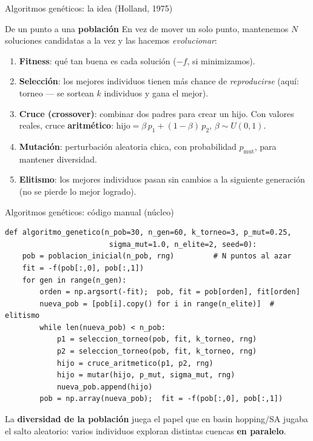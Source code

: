 \documentclass[aspectratio=169,10pt]{beamer}
\begin{document}
\begin{frame}{Algoritmos genéticos: la idea (Holland, 1975)}
  \begin{block}{De un punto a una \textbf{población}}
    En vez de mover un solo punto, mantenemos $N$ soluciones candidatas
    a la vez y las hacemos \emph{evolucionar}:
    \begin{enumerate}
      \item \textbf{Fitness}: qué tan buena es cada solución ($-f$, si
        minimizamos).
      \item \textbf{Selección}: los mejores individuos tienen más
        chance de \emph{reproducirse} (aquí: torneo — se sortean $k$
        individuos y gana el mejor).
      \item \textbf{Cruce (crossover)}: combinar dos padres para crear un
        hijo. Con valores reales, cruce \textbf{aritmético}:
        $\text{hijo}=\beta\,p_1+(1-\beta)\,p_2$, $\beta\sim U(0,1)$.
      \item \textbf{Mutación}: perturbación aleatoria chica, con
        probabilidad $p_{\text{mut}}$, para mantener diversidad.
      \item \textbf{Elitismo}: los mejores individuos pasan sin cambios
        a la siguiente generación (no se pierde lo mejor logrado).
    \end{enumerate}
  \end{block}
\end{frame}

\begin{frame}[fragile]{Algoritmos genéticos: código manual (núcleo)}
\begin{lstlisting}
def algoritmo_genetico(n_pob=30, n_gen=60, k_torneo=3, p_mut=0.25,
                        sigma_mut=1.0, n_elite=2, seed=0):
    pob = poblacion_inicial(n_pob, rng)         # N puntos al azar
    fit = -f(pob[:,0], pob[:,1])
    for gen in range(n_gen):
        orden = np.argsort(-fit);  pob, fit = pob[orden], fit[orden]
        nueva_pob = [pob[i].copy() for i in range(n_elite)]  # elitismo
        while len(nueva_pob) < n_pob:
            p1 = seleccion_torneo(pob, fit, k_torneo, rng)
            p2 = seleccion_torneo(pob, fit, k_torneo, rng)
            hijo = cruce_aritmetico(p1, p2, rng)
            hijo = mutar(hijo, p_mut, sigma_mut, rng)
            nueva_pob.append(hijo)
        pob = np.array(nueva_pob);  fit = -f(pob[:,0], pob[:,1])
\end{lstlisting}
  \small La \textbf{diversidad de la población} juega el papel que en
  basin hopping/SA jugaba el salto aleatorio: varios individuos exploran
  distintas cuencas \textbf{en paralelo}.
\end{frame}
\end{document}
